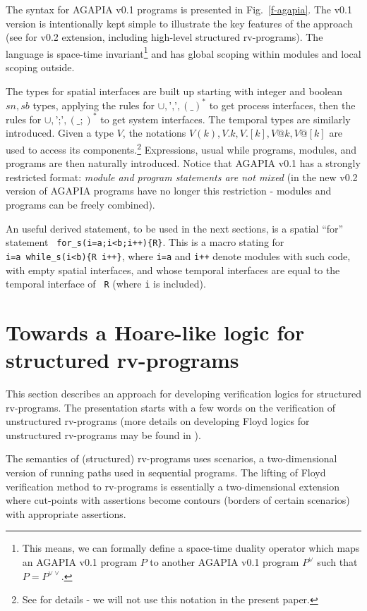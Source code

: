 \documentclass[runningheads]{llncs}
\newcommand{\1}{\u{a}}
\newcommand{\2}{\c{s}}
\newcommand{\5}{\c{t}}
\newcommand{\8}{\^{\i}}
\newcommand{\9}{\^{a}}
\newcommand{\foo}[1]{\footnote{#1}}
\begin{document}
The syntax for AGAPIA v0.1 programs is presented in Fig.~\ref{f-agapia}. The v0.1 version is intentionally
kept simple to illustrate the key features of the approach (see \cite{pss07} for v0.2 extension, including
high-level structured rv-programs). The language is space-time invariant\foo{This means, we can formally
  define a space-time duality operator which maps an AGAPIA v0.1 program $P$ to another AGAPIA v0.1 program
  $P^{\vee}$ such that $P=P^{\vee\vee}$.} and has global scoping within modules and local scoping outside.

The types for spatial interfaces are built up starting with integer and boolean $sn,sb$ types, applying the
rules for $\cup,\mbox{','},(\_)^*$ to get process interfaces, then the rules for $\cup,\mbox{';'},(\_;)^*$ to
get system interfaces. The temporal types are similarly introduced. Given a type $V$, the notations
$V(k),V.k,V.[k], V@k,V@[k]$ are used to access its components.\foo{See \cite{dr-st07b} for details - we will
  not use this notation in the present paper.} Expressions, usual while programs, modules, and programs are
then naturally introduced. Notice that AGAPIA v0.1 has a strongly restricted format: {\em module and program
  statements are not mixed} (in the new v0.2 version of AGAPIA \cite{pss07} programs have no longer this
restriction - modules and programs can be freely combined).

An useful derived statement, to be used in the next sections, is a spatial ``for'' statement {\tt
  for\_s(i=a;i<b;i++)\{R\}}. This is a macro stating for {\tt
  i=a\phcomp\ while\_s(i<b)\{R\phcomp\ i++\phcomp\}}, where {\tt i=a} and {\tt i++} denote modules with such
code, with empty spatial interfaces, and whose temporal interfaces are equal to the temporal interface of {\tt
  R} (where {\tt i} is included).

\section{Towards a Hoare-like logic for structured rv-programs}\label{s-hoare}

This section describes an approach for developing verification logics for structured rv-programs.  The
presentation starts with a few words on the verification of unstructured rv-programs (more details on
developing Floyd logics for unstructured rv-programs may be found in \cite{ste06b}).

The semantics of (structured) rv-programs uses scenarios, a two-dimensional version of running paths used in
sequential programs. The lifting of Floyd verification method to rv-programs is essentially a two-dimensional
extension where cut-points with assertions become contours (borders of certain scenarios) with appropriate
assertions.
\end{document}
